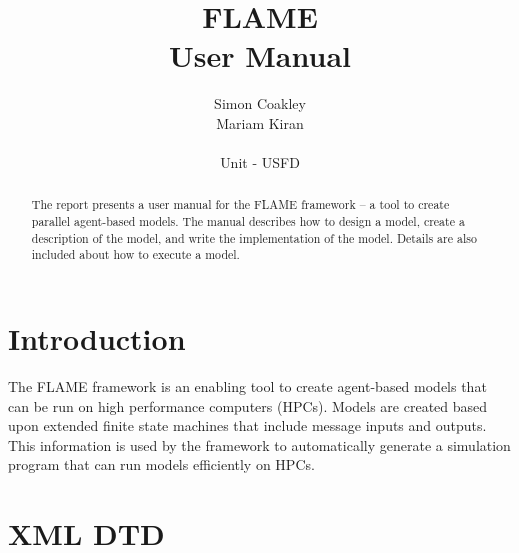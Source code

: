 \documentclass[12pt,a4paper]{article}
\begin{document}
\title{FLAME
\\User Manual}
\author{Simon Coakley\\Mariam Kiran
\\
\\ Unit - USFD}

\maketitle



\begin{abstract}
The report presents a user manual for the FLAME framework -- a tool to create
parallel agent-based models. The manual describes how to design a model, create
a description of the model, and write the implementation of the model. Details are also included about how to execute a model.
\end{abstract}

\pagebreak
\tableofcontents
\pagebreak

\section{Introduction}

The FLAME framework is an enabling tool to create agent-based models that can
be run on high performance computers (HPCs). Models are created based upon
extended finite state machines that include message inputs and outputs. This information
is used by the framework to automatically generate a simulation program that
can run models efficiently on HPCs.






\appendix

\section{XML DTD}                       %
\label{cha_xmldtd}

\small{{\tt }}


%
%
\end{document}
